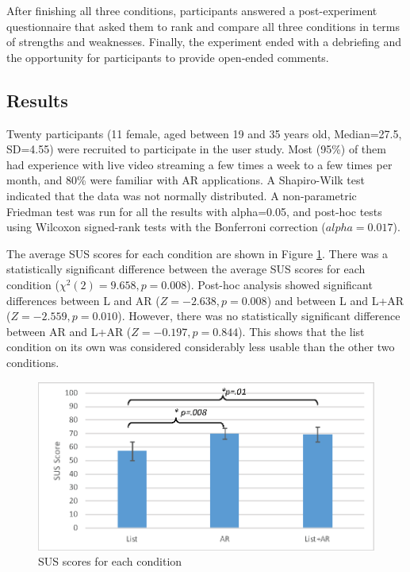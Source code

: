
After finishing all three conditions, participants answered a post-experiment questionnaire that asked them to rank and compare all three conditions in terms of strengths and weaknesses. Finally, the experiment ended with a debriefing and the opportunity for participants to provide open-ended comments.

\subsection{Results}

Twenty participants (11 female, aged between 19 and 35 years old, Median=27.5, SD=4.55) were recruited to participate in the user study. Most (95\%) of them had experience with live video streaming a few times a week to a few times per month, and 80\% were familiar with AR applications. A Shapiro-Wilk test indicated that the data was not normally distributed. A non-parametric Friedman test was run for all the results with alpha=0.05, and post-hoc tests using Wilcoxon signed-rank tests with the Bonferroni correction ($alpha=0.017$).

The average SUS scores for each condition are shown in Figure \ref{fig:mgia16:questions_sus}. There was a statistically significant difference between the average SUS scores for each condition ($\chi^2(2)=9.658, p=0.008$). Post-hoc analysis showed significant differences between L and AR ($Z=-2.638, p=0.008$) and between L and L+AR ($Z=-2.559, p=0.010$). However, there was no statistically significant difference between AR and L+AR ($Z=-0.197, p=0.844$). This shows that the list condition on its own was considered considerably less usable than the other two conditions.

\begin{figure}[htb]
  \centering
  \includegraphics[width=0.8\linewidth]{images/61-video-mgia16/sus2.eps}
  \caption{SUS scores for each condition}
  \label{fig:mgia16:questions_sus}
\end{figure}

